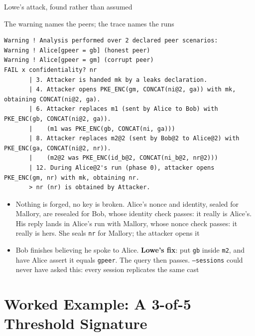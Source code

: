 \ifdefined\PRESENTATION\else\PassOptionsToClass{handout}{beamer}\fi\documentclass[aspectratio=169, lualatex]{beamer}
\newcommand{\vpcode}{\fontsize{6}{6.4}\selectfont\ttfamily\color{vpink}}
\begin{document}
\begin{frame}[fragile]{Lowe's attack, found rather than assumed}
	\begin{vpresult}[top=0.5mm, bottom=0.5mm]{The warning names the peers; the trace names the runs}
		\begin{lstlisting}[basicstyle=\vpcode]
Warning ! Analysis performed over 2 declared peer scenarios:
Warning ! Alice[gpeer = gb] (honest peer)
Warning ! Alice[gpeer = gm] (corrupt peer)
FAIL x confidentiality? nr
       | 3. Attacker is handed mk by a leaks declaration.
       | 4. Attacker opens PKE_ENC(gm, CONCAT(ni@2, ga)) with mk, obtaining CONCAT(ni@2, ga).
       | 6. Attacker replaces m1 (sent by Alice to Bob) with PKE_ENC(gb, CONCAT(ni@2, ga)).
       |    (m1 was PKE_ENC(gb, CONCAT(ni, ga)))
       | 8. Attacker replaces m2@2 (sent by Bob@2 to Alice@2) with PKE_ENC(ga, CONCAT(ni@2, nr)).
       |    (m2@2 was PKE_ENC(id_b@2, CONCAT(ni_b@2, nr@2)))
       | 12. During Alice@2's run (phase 0), attacker opens PKE_ENC(gm, nr) with mk, obtaining nr.
       > nr (nr) is obtained by Attacker.
\end{lstlisting}
	\end{vpresult}
	\footnotesize
	\begin{itemize}
		\item Nothing is forged, no key is broken. Alice's nonce and identity, sealed for Mallory, are resealed for Bob, whose identity check passes: it really is Alice's. His reply lands in Alice's run with Mallory, whose nonce check passes: it really is hers. She seals \texttt{nr} for Mallory; the attacker opens it
		\item Bob finishes believing he spoke to Alice. \textbf{Lowe's fix}: put \texttt{gb} inside \texttt{m2}, and have Alice assert it equals \texttt{gpeer}. The query then passes. \texttt{--sessions} could never have asked this: every session replicates the same cast
	\end{itemize}
\end{frame}

\section{Worked Example: A 3-of-5 Threshold Signature}
\end{document}
